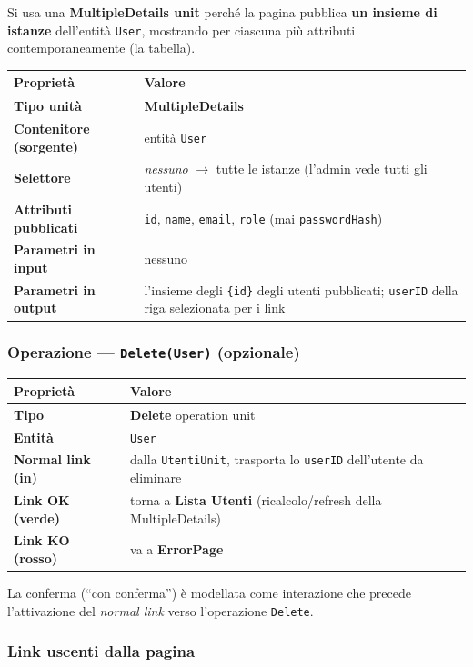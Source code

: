 \documentclass[11pt,a4paper]{article}
\newcommand{\code}[1]{\texttt{\small #1}}
\begin{document}
Si usa una \textbf{MultipleDetails unit} perché la pagina pubblica \textbf{un
insieme di istanze} dell'entità \code{User}, mostrando per ciascuna più attributi
contemporaneamente (la tabella).

\renewcommand{\arraystretch}{1.3}
\begin{tabularx}{\textwidth}{>{\bfseries}p{4.2cm} X}
\toprule
\normalfont Proprietà & Valore \\
\midrule
Tipo unità & \textbf{MultipleDetails} \\
Contenitore (sorgente) & entità \code{User} \\
Selettore & \emph{nessuno} $\rightarrow$ tutte le istanze (l'admin vede tutti gli utenti) \\
Attributi pubblicati & \code{id}, \code{name}, \code{email}, \code{role} (mai \code{passwordHash}) \\
Parametri in input & nessuno \\
Parametri in output & l'insieme degli \code{\{id\}} degli utenti pubblicati; \code{userID} della riga selezionata per i link \\
\bottomrule
\end{tabularx}

\subsubsection{Operazione --- \texttt{Delete(User)} (opzionale)}

\begin{tabularx}{\textwidth}{>{\bfseries}p{3.6cm} X}
\toprule
\normalfont Proprietà & Valore \\
\midrule
Tipo & \textbf{Delete} operation unit \\
Entità & \code{User} \\
Normal link (in) & dalla \code{UtentiUnit}, trasporta lo \code{userID} dell'utente da eliminare \\
Link OK (verde) & torna a \textbf{Lista Utenti} (ricalcolo/refresh della MultipleDetails) \\
Link KO (rosso) & va a \textbf{ErrorPage} \\
\bottomrule
\end{tabularx}

\medskip
La conferma (``con conferma'') è modellata come interazione che precede
l'attivazione del \emph{normal link} verso l'operazione \code{Delete}.

\subsubsection{Link uscenti dalla pagina}
\end{document}
